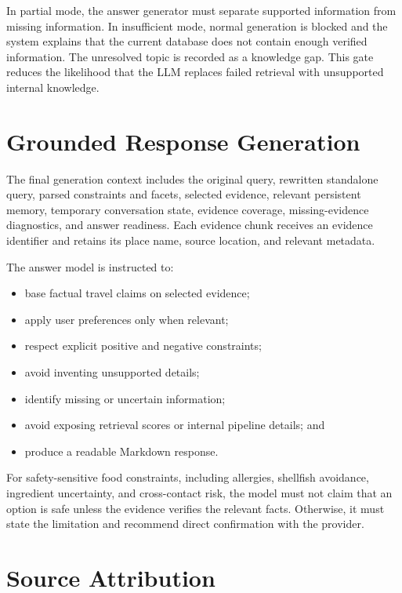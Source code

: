 In partial mode, the answer generator must separate supported information from
missing information. In insufficient mode, normal generation is blocked and
the system explains that the current database does not contain enough verified
information. The unresolved topic is recorded as a knowledge gap. This gate
reduces the likelihood that the LLM replaces failed retrieval with unsupported
internal knowledge.

\section{Grounded Response Generation}

The final generation context includes the original query, rewritten standalone
query, parsed constraints and facets, selected evidence, relevant persistent
memory, temporary conversation state, evidence coverage, missing-evidence
diagnostics, and answer readiness. Each evidence chunk receives an evidence
identifier and retains its place name, source location, and relevant metadata.

The answer model is instructed to:

\begin{itemize}
    \item base factual travel claims on selected evidence;
    \item apply user preferences only when relevant;
    \item respect explicit positive and negative constraints;
    \item avoid inventing unsupported details;
    \item identify missing or uncertain information;
    \item avoid exposing retrieval scores or internal pipeline details; and
    \item produce a readable Markdown response.
\end{itemize}

For safety-sensitive food constraints, including allergies, shellfish
avoidance, ingredient uncertainty, and cross-contact risk, the model must not
claim that an option is safe unless the evidence verifies the relevant facts.
Otherwise, it must state the limitation and recommend direct confirmation with
the provider.

\section{Source Attribution}


